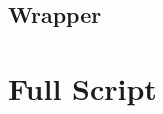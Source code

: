 \documentclass[letterpaper,12pt,english]{sphinxmanual}
\begin{document}
\subsection{ Wrapper}
\label{\detokenize{sphinx:makefile-wrapper}}
\begin{sphinxVerbatim}[commandchars=\\\{\}]
         
\end{sphinxVerbatim}


\section{Full  Script}
\label{\detokenize{sphinx:full-docgen-py-script}}
\end{document}
